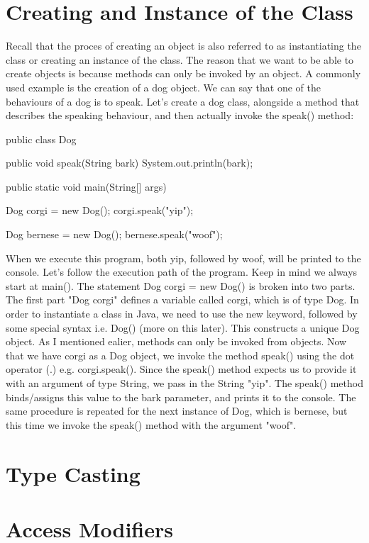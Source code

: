 \documentclass{article}
\begin{document}
\section{Creating and Instance of the Class}

Recall that the proces of creating an object is also referred to as instantiating the class or creating an
instance of the class. The reason that we want to be able to create objects is because methods can only be
invoked by an object. A commonly used example is the creation of a dog object. We can say that one of the
behaviours of a dog is to speak. Let’s create a dog class, alongside a method that describes the speaking
behaviour, and then actually invoke the speak() method:

\begin{jlst}
public class Dog {
    public void speak(String bark) {
        System.out.println(bark);
    }

    public static void main(String[] args) {
        Dog corgi = new Dog();
        corgi.speak("yip");

        Dog bernese = new Dog();
        bernese.speak("woof");
    }
}
\end{jlst}

When we execute this program, both yip, followed by woof, will be printed to the console. Let’s follow the
execution path of the program. Keep in mind we always start at main(). The statement Dog corgi = new Dog() is
broken into two parts. The first part "Dog corgi" defines a variable called corgi, which is of type Dog. In
order to instantiate a class in Java, we need to use the new keyword, followed by some special syntax i.e.
Dog() (more on this later). This constructs a unique Dog object. As I mentioned ealier, methods can only be
invoked from objects. Now that we have corgi as a Dog object, we invoke the method speak() using the dot
operator (.) e.g. corgi.speak(). Since the speak() method expects us to provide it with an argument of type
String, we pass in the String "yip". The speak() method binds/assigns this value to the bark parameter, and
prints it to the console. The same procedure is repeated for the next instance of Dog, which is bernese, but
this time we invoke the speak() method with the argument "woof".

\section{Type Casting}

\section{Access Modifiers}
\end{document}
